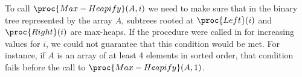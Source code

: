 To call $\proc{Max-Heapify}(A,i)$ we need to make sure that in the binary tree represented by the array $A$, subtrees rooted at $\proc{Left}(i)$ and $\proc{Right}(i)$ are max-heaps.
If the procedure  were called in  for increasing values for $i$, we could not guarantee that this condition would be met.
For instance, if $A$ is an array of at least 4 elements in sorted order, that condition fails before the call to $\proc{Max-Heapify}(A,1)$.
